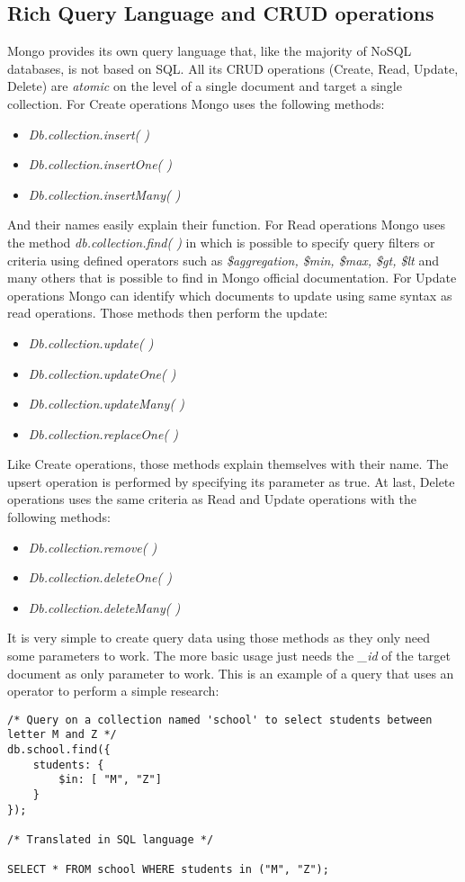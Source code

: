 \subsection{Rich Query Language and CRUD operations}
Mongo provides its own query language that, like the majority of NoSQL databases, is not based on SQL. All its CRUD operations (Create, Read, Update, Delete) are \textit{atomic} on the level of a single document and target a single collection.
For Create operations Mongo uses the following methods:
\begin{itemize}
	\item \textit{Db.collection.insert( )}
	\item \textit{Db.collection.insertOne( )}
	\item \textit{Db.collection.insertMany( )}
\end{itemize}
And their names easily explain their function.
For Read operations Mongo uses the method \textit{db.collection.find( )} in which is possible to specify query filters or criteria using defined operators such as \textit{\$aggregation, \$min, \$max, \$gt, \$lt} and many others that is possible to find in Mongo official documentation.
For Update operations Mongo can identify which documents to update using same syntax as read operations. Those methods then perform the update:
\begin{itemize}
	\item \textit{Db.collection.update( )}
	\item \textit{Db.collection.updateOne( )}
	\item \textit{Db.collection.updateMany( )}
	\item \textit{Db.collection.replaceOne( )}
\end{itemize}
Like Create operations, those methods explain themselves with their name. The upsert operation is performed by specifying its parameter as true.
At last, Delete operations uses the same criteria as Read and Update operations with the following methods:
\begin{itemize}
	\item \textit{Db.collection.remove( )}
	\item \textit{Db.collection.deleteOne( )}
	\item \textit{Db.collection.deleteMany( )}
\end{itemize}

It is very simple to create query data using those methods as they only need some parameters to work. The more basic usage just needs the \textit{\_id} of the target document as only parameter to work.
This is an example of a query that uses an operator to perform a simple research:
\begin{lstlisting}
/* Query on a collection named 'school' to select students between letter M and Z */
db.school.find({
	students: {
		$in: [ "M", "Z"]
	}
});

/* Translated in SQL language */

SELECT * FROM school WHERE students in ("M", "Z");
\end{lstlisting}

